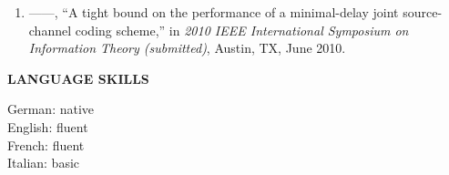 {\begin{enumerate}
\item
------, ``A tight bound on the performance of a minimal-delay joint
  source-channel coding scheme,'' in \emph{2010 IEEE International Symposium on
  Information Theory (submitted)}, Austin, TX, June 2010.
\end{enumerate}


\vspace{\baselineskip}
\noindent\textsf{\textbf{LANGUAGE SKILLS}}
\vspace{0.5\baselineskip}

\noindent
German: native\\
English: fluent\\
French: fluent\\
Italian: basic

}
